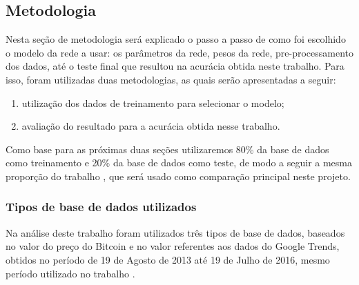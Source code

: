 \subsection{Metodologia}
\label{sec:metodologia}
Nesta seção de metodologia será explicado o passo a passo de como foi escolhido o modelo da rede a usar: os parâmetros da rede, pesos da rede, pre-processamento dos dados, até o teste final que resultou na acurácia obtida neste trabalho. Para isso, foram utilizadas duas metodologias, as quais serão apresentadas a seguir: 
\begin{enumerate}
\item utilização dos dados de treinamento para selecionar o modelo; 
\item avaliação do resultado para a acurácia obtida nesse trabalho.
\end{enumerate}

Como base para as próximas duas seções utilizaremos 80\% da base de dados como treinamento e 20\% da base de dados como teste, de modo a seguir a mesma proporção do trabalho \cite{mcnally2016predicting}, que será usado como comparação principal neste projeto.

\subsubsection{Tipos de base de dados utilizados}
\label{sec:metobase}
Na análise deste trabalho foram utilizados três tipos de base de dados, baseados no valor do preço do Bitcoin e no valor referentes aos dados do Google Trends, obtidos no período de 19 de Agosto de 2013 até 19 de Julho de 2016, mesmo período utilizado no trabalho \cite{mcnally2016predicting}.

